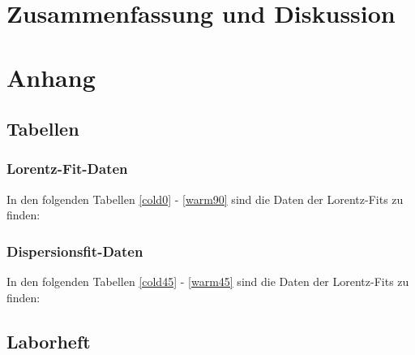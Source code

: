 \documentclass[12pt]{article}
\begin{document}
\clearpage
\section{Zusammenfassung und Diskussion}
\label{diskussion}

\newpage
\section{Anhang}



\subsection{Tabellen}

\subsubsection{Lorentz-Fit-Daten\label{LD}}
In den folgenden Tabellen \ref{cold0} - \ref{warm90} sind die Daten der Lorentz-Fits zu finden:







\subsubsection{Dispersionsfit-Daten\label{DD}}
In den folgenden Tabellen \ref{cold45} - \ref{warm45} sind die Daten der Lorentz-Fits zu finden:


%


%
\clearpage

\subsection{Laborheft}
\end{document}
